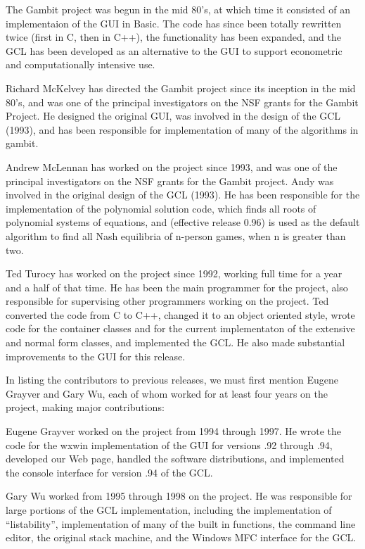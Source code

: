 \documentclass[12pt]{report}
\begin{document}
The Gambit project was begun in the mid 80's, at which time it
consisted of an implementaion of the GUI in Basic.  The code has since
been totally rewritten twice (first in C, then in C++), the
functionality has been expanded, and the GCL has been developed as an
alternative to the GUI to support econometric and computationally
intensive use.

Richard McKelvey has directed the Gambit project since its inception
in the mid 80's, and was one of the principal investigators on the NSF
grants for the Gambit Project.  He designed the original GUI, was
involved in the design of the GCL (1993), and has been responsible for
implementation of many of the algorithms in gambit.

Andrew McLennan has worked on the project since 1993, and was one of
the principal investigators on the NSF grants for the Gambit project.
Andy was involved in the original design of the GCL (1993).  He has
been responsible for the implementation of the polynomial solution
code, which finds all roots of polynomial systems of equations, and
(effective release 0.96) is used as the default algorithm to find all
Nash equilibria of n-person games, when n is greater than two.

Ted Turocy has worked on the project since 1992, working full time for
a year and a half of that time.  He has been the main programmer for
the project, also responsible for supervising other programmers
working on the project.  Ted converted the code from C to C++, changed
it to an object oriented style, wrote code for the container classes
and for the current implementaton of the extensive and normal form
classes, and implemented the GCL.  He also made substantial
improvements to the GUI for this release.

In listing the contributors to previous releases, we must
first mention Eugene Grayver and Gary Wu, each of whom worked
for at least four years on the project, making major contributions:

Eugene Grayver worked on the project from 1994 through 1997.
He wrote the code for the wxwin implementation of the GUI for versions
.92 through .94, developed our Web page, handled the software
distributions, and implemented the console interface for version .94
of the GCL.

Gary Wu worked from 1995 through 1998 on the project.  He was
responsible for large portions of the GCL implementation, including
the implementation of ``listability'', implementation of many of the
built in functions, the command line editor, the original stack
machine, and the Windows MFC interface for the GCL.
\end{document}
